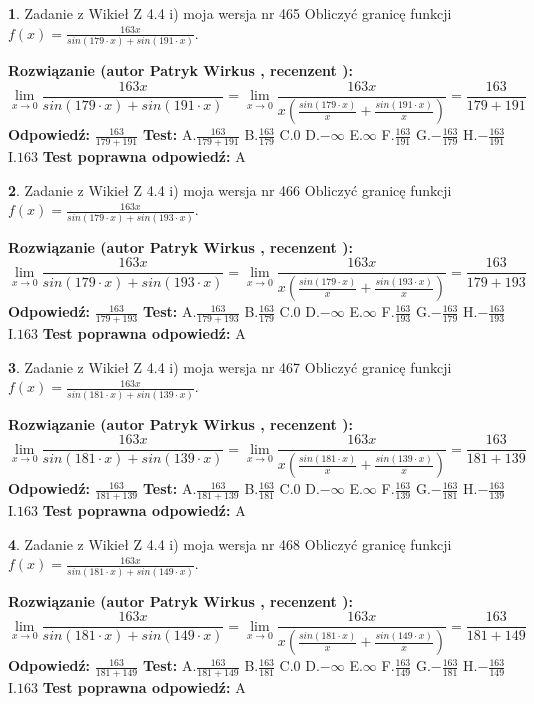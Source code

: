 \documentclass[12pt, a4paper]{article}
\theoremstyle{definition} %
\newtheorem{zad}{}
\newcommand{\zadStart}[1]{\begin{zad}#1\newline}
\newcommand{\zadStop}{\end{zad}}
\newcommand{\rozwStart}[2]{\noindent \textbf{Rozwiązanie (autor #1 , recenzent #2): }\newline}
\newcommand{\rozwStop}{\newline}
\newcommand{\odpStart}{\noindent \textbf{Odpowiedź:}\newline}
\newcommand{\odpStop}{\newline}
\newcommand{\testStart}{\noindent \textbf{Test:}\newline}
\newcommand{\testStop}{\newline}
\newcommand{\kluczStart}{\noindent \textbf{Test poprawna odpowiedź:}\newline}
\newcommand{\kluczStop}{\newline}
\begin{document}
\zadStart{Zadanie z Wikieł Z 4.4 i) moja wersja nr 465}
Obliczyć granicę funkcji $f(x)=\frac{163x}{sin(179\cdot x) +sin(191\cdot x)}$.
\zadStop
\rozwStart{Patryk Wirkus}{}
$$\lim\limits_{x\to 0}\frac{163x}{sin(179\cdot x) +sin(191\cdot x)}=\lim\limits_{x\to 0}\frac{163x}{x(\frac{sin(179\cdot x)}{x}+\frac{sin(191\cdot x)}{x})}=\frac{163}{179+191}$$
\rozwStop
\odpStart
$\frac{163}{179+191}$
\odpStop
\testStart
A.$\frac{163}{179+191}$
B.$\frac{163}{179}$
C.$0$
D.$-\infty$
E.$\infty$
F.$\frac{163}{191}$
G.$-\frac{163}{179}$
H.$-\frac{163}{191}$
I.$163$
\testStop
\kluczStart
A
\kluczStop



\zadStart{Zadanie z Wikieł Z 4.4 i) moja wersja nr 466}
Obliczyć granicę funkcji $f(x)=\frac{163x}{sin(179\cdot x) +sin(193\cdot x)}$.
\zadStop
\rozwStart{Patryk Wirkus}{}
$$\lim\limits_{x\to 0}\frac{163x}{sin(179\cdot x) +sin(193\cdot x)}=\lim\limits_{x\to 0}\frac{163x}{x(\frac{sin(179\cdot x)}{x}+\frac{sin(193\cdot x)}{x})}=\frac{163}{179+193}$$
\rozwStop
\odpStart
$\frac{163}{179+193}$
\odpStop
\testStart
A.$\frac{163}{179+193}$
B.$\frac{163}{179}$
C.$0$
D.$-\infty$
E.$\infty$
F.$\frac{163}{193}$
G.$-\frac{163}{179}$
H.$-\frac{163}{193}$
I.$163$
\testStop
\kluczStart
A
\kluczStop



\zadStart{Zadanie z Wikieł Z 4.4 i) moja wersja nr 467}
Obliczyć granicę funkcji $f(x)=\frac{163x}{sin(181\cdot x) +sin(139\cdot x)}$.
\zadStop
\rozwStart{Patryk Wirkus}{}
$$\lim\limits_{x\to 0}\frac{163x}{sin(181\cdot x) +sin(139\cdot x)}=\lim\limits_{x\to 0}\frac{163x}{x(\frac{sin(181\cdot x)}{x}+\frac{sin(139\cdot x)}{x})}=\frac{163}{181+139}$$
\rozwStop
\odpStart
$\frac{163}{181+139}$
\odpStop
\testStart
A.$\frac{163}{181+139}$
B.$\frac{163}{181}$
C.$0$
D.$-\infty$
E.$\infty$
F.$\frac{163}{139}$
G.$-\frac{163}{181}$
H.$-\frac{163}{139}$
I.$163$
\testStop
\kluczStart
A
\kluczStop



\zadStart{Zadanie z Wikieł Z 4.4 i) moja wersja nr 468}
Obliczyć granicę funkcji $f(x)=\frac{163x}{sin(181\cdot x) +sin(149\cdot x)}$.
\zadStop
\rozwStart{Patryk Wirkus}{}
$$\lim\limits_{x\to 0}\frac{163x}{sin(181\cdot x) +sin(149\cdot x)}=\lim\limits_{x\to 0}\frac{163x}{x(\frac{sin(181\cdot x)}{x}+\frac{sin(149\cdot x)}{x})}=\frac{163}{181+149}$$
\rozwStop
\odpStart
$\frac{163}{181+149}$
\odpStop
\testStart
A.$\frac{163}{181+149}$
B.$\frac{163}{181}$
C.$0$
D.$-\infty$
E.$\infty$
F.$\frac{163}{149}$
G.$-\frac{163}{181}$
H.$-\frac{163}{149}$
I.$163$
\testStop
\kluczStart
A
\kluczStop
\end{document}
